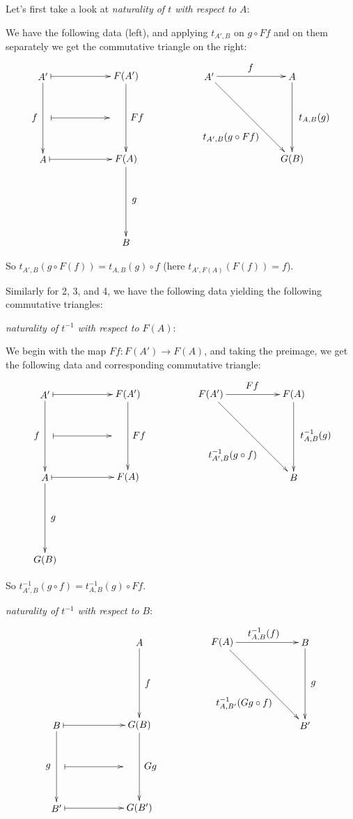 \documentclass[11pt]{article}
\theoremstyle{definition}
\theoremstyle{definition}
\theoremstyle{plain}
\theoremstyle{plain}
\theoremstyle{plain}
\begin{document}
Let's first take a look at \emph{naturality of $t$ with respect to $A$}:

We have the following data (left), and applying $t_{A',B}$ on $g \circ Ff$ and on them separately we get the commutative triangle on the right:

\begin{equation*}
\begin{xy}
(0,0)*+{A'}="ap"; (30, 0)*+{F(A')}="fap"; (0, -30)*+{A}="a"; (30, -30)*+{F(A)}="fa"; (30, -60)*+{B}="b";
(60,0)*+{A'}="apt"; (90, 0)*+{A}="at"; (90, -30)*+{G(B)}="gb";
{\ar "ap";"a"}?*!/^3mm/{f}; {\ar "fap";"fa"}?*!/_4mm/{Ff}; {\ar "fa";"b"}?*!/_3mm/{g};
{\ar@{|->} "ap";"fap"}; {\ar@{|->} (3,-15);(24, -15)}; {\ar@{|->} "a";"fa"};
{\ar "apt";"at"}?*!/_3mm/{f};
{\ar "at";"gb"}?*!/_8mm/{t_{A,B}(g)};
{\ar "apt";"gb"}?*!/^10mm/{t_{A',B}(g \circ Ff)}
\end{xy}
\end{equation*}

So $t_{A',B}(g \circ F(f)) = t_{A,B}(g) \circ f$ (here $t_{A',F(A)}(F(f)) = f$).

Similarly for 2, 3, and 4, we have the following data yielding the following commutative triangles:

\emph{naturality of $t^{-1}$ with respect to $F(A)$}:

We begin with the map $Ff : F(A') \to F(A)$, and taking the preimage, we get the following data and corresponding commutative triangle:

\begin{equation*}
\begin{xy}
(0,0)*+{A'}="ap"; (30, 0)*+{F(A')}="fap"; (0, -30)*+{A}="a"; (30, -30)*+{F(A)}="fa"; (00, -60)*+{G(B)}="gb";
(60,0)*+{F(A')}="fapt"; (90, 0)*+{F(A)}="fat"; (90, -30)*+{B}="b";
{\ar "ap";"a"}?*!/^3mm/{f}; {\ar "fap";"fa"}?*!/_4mm/{Ff}; {\ar "a";"gb"}?*!/_3mm/{g};
{\ar@{|->} "ap";"fap"}; {\ar@{|->} (3,-15);(24, -15)}; {\ar@{|->} "a";"fa"};
{\ar "fapt";"fat"}?*!/_3mm/{Ff};
{\ar "fat";"b"}?*!/_8mm/{t^{-1}_{A,B}(g)};
{\ar "fapt";"b"}?*!/^10mm/{t^{-1}_{A',B}(g \circ f)}
\end{xy}
\end{equation*}

So $t^{-1}_{A',B}(g \circ f) = t^{-1}_{A,B}(g) \circ Ff$.

\emph{naturality of $t^{-1}$ with respect to $B$}:

\begin{equation*}
\begin{xy}
(30, 0)*+{A}="a"; (0, -30)*+{B}="b"; (30, -30)*+{G(B)}="gb"; (0, -60)*+{B'}="bp"; (30, -60)*+{G(B')}="gbp";
(60, 0)*+{F(A)}="fat"; (90, 0)*+{B}="bt"; (90, -30)*+{B'}="bpt";
{\ar "a";"gb"}?*!/_3mm/{f}; {\ar "gb";"gbp"}?*!/_4mm/{Gg}; {\ar "b";"bp"}?*!/^3mm/{g};
{\ar@{|->} "b";"gb"}; {\ar@{|->} "bp";"gbp"}; {\ar@{|->} (3, -45);(24, -45)};
{\ar "fat";"bt"}?*!/_3mm/{t^{-1}_{A,B}(f)};
{\ar "bt";"bpt"}?*!/_3mm/{g};
{\ar "fat";"bpt"}?*!/^10mm/{t^{-1}_{A,B'}(Gg \circ f)};
\end{xy}
\end{equation*}
\end{document}

